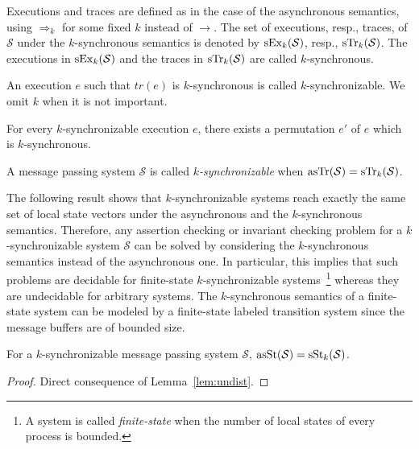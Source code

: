 Executions and traces are defined as in the case of the asynchronous semantics, using $\Rightarrow_k$ for some fixed $k$ instead of $\rightarrow$. The set of executions, resp., traces, of $\mathcal{S}$ under the $k$-synchronous semantics is denoted by $\synchExec{\mathcal{S}}{k}$, resp., $\synchTr{\mathcal{S}}{k}$. The executions in $\synchExec{\mathcal{S}}{k}$ and the traces in 
$\synchTr{\mathcal{S}}{k}$ are called $k$-synchronous. 

An execution $e$ such that $tr(e)$ is $k$-synchronous is called $k$-synchronizable. We omit $k$ when it is not important.

\begin{lemma}\label{lem:zable_nous}
For every $k$-synchronizable execution $e$, there exists a permutation $e'$ of $e$ which is $k$-synchronous.
\end{lemma}


\begin{definition}\label{def:synchron}
A message passing system $\mathcal{S}$ is called \emph{$k$-synchronizable} when $\asynchTr{\mathcal{S}}=\synchTr{\mathcal{S}}{k}$.
\end{definition}


The following result shows that $k$-synchronizable systems reach exactly the same set of local state vectors under the asynchronous and the $k$-synchronous semantics. Therefore, any assertion checking or invariant checking problem for a $k$-synchronizable system $\mathcal{S}$ can be solved by considering the $k$-synchronous semantics instead of the asynchronous one. In particular, this implies that such problems are decidable for finite-state $k$-synchronizable systems~\footnote{A system is called \emph{finite-state} when the number of local states of every process is bounded.} whereas they are undecidable for arbitrary systems. The $k$-synchronous semantics of a finite-state system can be modeled by a finite-state labeled transition system since the message buffers are of bounded size.

\begin{theorem}
For a $k$-synchronizable message passing system $\mathcal{S}$, $\asynchSt{\mathcal{S}}=\synchSt{\mathcal{S}}{k}$.
\end{theorem}
\begin{proof}
Direct consequence of Lemma~\ref{lem:undist}.
\end{proof}

